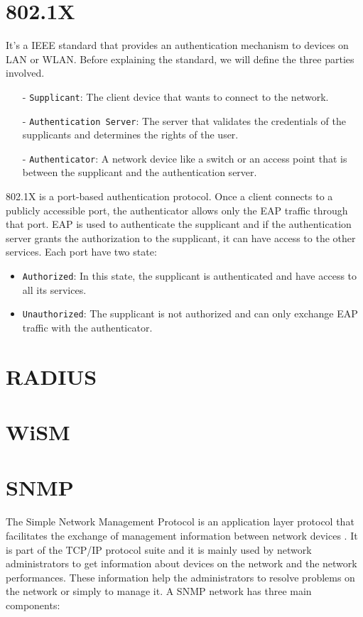 \section{802.1X}
It's a IEEE standard that provides an authentication mechanism to devices on LAN or WLAN. Before explaining the standard, we will define the three parties involved.
\begin{itemize}
	\item[-]\texttt{Supplicant}: The client device that wants to connect to the network.
	\item[-]\texttt{Authentication Server}: The server that validates the credentials of the supplicants and determines the rights of the user.
	\item[-]\texttt{Authenticator}: A network device like a switch or an access point that is between the supplicant and the authentication server.
\end{itemize} 
802.1X is a port-based authentication protocol. Once a client connects to a publicly accessible port, the authenticator allows only the EAP traffic through that port. EAP is used to authenticate the supplicant and if the authentication server grants the authorization to the supplicant, it can have access to the other services.
Each port have two state:
\begin{itemize}
\item \texttt{Authorized}: In this state, the supplicant is authenticated and have access to all its services.
\item \texttt{Unauthorized}: The supplicant is not authorized and can only exchange EAP traffic with the authenticator.
\end{itemize}


\section{RADIUS}


\section{WiSM}


\section{SNMP}

The Simple Network Management Protocol is an application layer protocol that facilitates the exchange of management information between network devices \cite{snmp}. It is part of the TCP/IP protocol suite and it is mainly used by network administrators to get information about devices on the network and the network performances. These information help the administrators to resolve problems on the network or simply to manage it.
A SNMP network has three main components:

